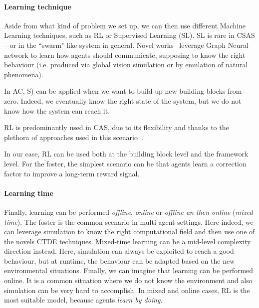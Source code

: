 \documentclass[conference]{IEEEtran}
\begin{document}
\paragraph{Learning technique}
Aside from what kind of problem we set up, we can then use different Machine Learning techniques,
 such as RL or Supervised Learning (SL).
%
SL is rare in CSAS -- or in the ``swarm" like system in general.
%
Novel works~\cite{DBLP:conf/corl/TolstayaGPP0R19} leverage Graph Neural network to learn how agents should communicate, 
 supposing to know the right behaviour (i.e. produced via global vision simulation or by emulation of natural phenomena).

In AC, S) can be applied when we want to build up new building blocks from zero. 
% 
Indeed, we eventually know the right state of the system, but we do not know how the system can reach it.

RL is predominantly used in CAS, 
 due to its flexibility and thanks to the plethora of approaches used in this scenario~\cite{csas-and-marl}.

In our case, RL can be used both at the building block level and the framework level.
%
For the foster, the simplest scenario can be that agents learn a correction factor to improve a long-term reward signal.
 
\paragraph{Learning time}
Finally, learning can be performed \textit{offline}, \textit{online} or \textit{offline an then online} (\textit{mixed time}).
% 
The foster is the common scenario in multi-agent settings.
 Here indeed, we can leverage simulation to know the right computational field and then use one of the novels CTDE techniques. 
Mixed-time learning can be a mid-level complexity direction instead.
 Here, simulation can always be exploited to reach a good behaviour, but at runtime, 
 the behaviour can be adapted based on the new environmental situations. 
Finally, we can imagine that learning can be performed online. 
 It is a common situation where we do not know the environment and also simulation can be very hard to accomplish. 
 In mixed and online cases, RL is the most suitable model, because agents \textit{learn by doing}.
\end{document}
